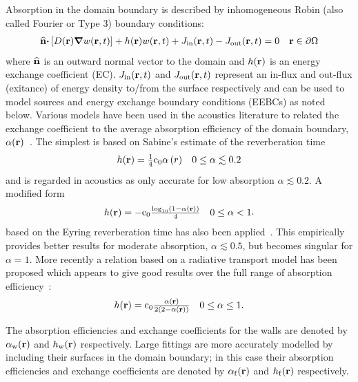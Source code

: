 \documentclass[a4paper]{article}
\numberwithin{equation}{section}
\begin{document}
Absorption in the domain boundary is described by inhomogeneous Robin (also
called Fourier or Type 3) boundary conditions:
\begin{align}
\begin{matrix}
\widehat{\boldsymbol{\mathrm{n}}}\boldsymbol{\mathrm{\cdot}}\left[D(\boldsymbol{\mathrm{r}})\boldsymbol{\mathrm{\nabla}} w(\boldsymbol{\mathrm{r}},t)\right] + h(\boldsymbol{\mathrm{r}}) w(\boldsymbol{\mathrm{r}},t) + J_\mathrm{in}(\boldsymbol{\mathrm{r}},t) - J_\mathrm{out}(\boldsymbol{\mathrm{r}},t) = 0 &\boldsymbol{\mathrm{r}}\in\partial\Omega
\end{matrix}
\end{align}
where $\widehat{\boldsymbol{\mathrm{n}}}$ is an outward normal vector to the domain and 
$h(\boldsymbol{\mathrm{r}})$ is an energy exchange coefficient (EC). $J_\mathrm{in}(\boldsymbol{\mathrm{r}},t)$ and
$J_\mathrm{out}(\boldsymbol{\mathrm{r}},t)$ represent an in-flux and out-flux (exitance) of energy density to/from the surface 
respectively and can be used to model sources and energy exchange boundary conditions (EEBCs) as noted below.
Various models have been used in the acoustics literature to related the exchange coefficient to the
average absorption efficiency of the domain boundary, $\alpha(\boldsymbol{\mathrm{r}})$~\citep{Jing2008,Xiang2009}. The
simplest is based on Sabine's estimate of the reverberation time~\citep{Sabine1922}
\begin{align}
\begin{matrix}
h(\boldsymbol{\mathrm{r}}) = \frac{1}{4}\mathrm{c}_0\alpha \left(r\right)&0\leq\alpha\lesssim 0.2
\end{matrix}
\end{align}
and is regarded in acoustics as only accurate for low absorption $\alpha\lesssim 0.2$. 
A modified form
\begin{align}
\begin{matrix}
h(\boldsymbol{\mathrm{r}}) = -\mathrm{c}_0\frac{\log_{10}\left(1-\alpha(\boldsymbol{\mathrm{r}})\right)}{4} &0\leq\alpha< 1
\end{matrix}.
\end{align}
based on the Eyring reverberation time has also been applied~\citep{Eyring1930}.
This empirically provides better results for moderate absorption, $\alpha\lesssim 0.5$, 
but becomes singular for $\alpha=1$. More recently a relation based on
a radiative transport model has been proposed which appears to give good
results over the full range of absorption efficiency~\citep{Jing2008}:
\begin{align}
\begin{matrix}
h(\boldsymbol{\mathrm{r}}) =\mathrm{c}_0\frac{\alpha(\boldsymbol{\mathrm{r}})}{2\left(2-\alpha(\boldsymbol{\mathrm{r}})\right)} & 0\leq\alpha\leq 1 .
\end{matrix}
\end{align}

The absorption efficiencies and exchange coefficients for the walls are denoted 
by $\alpha_{\mathrm{w}}(\boldsymbol{\mathrm{r}})$ and $h_{\mathrm{w}}(\boldsymbol{\mathrm{r}})$ respectively. Large fittings are more
accurately modelled by including their surfaces in the domain boundary; in 
this case their absorption efficiencies and exchange coefficients are denoted by
$\alpha_{\mathrm{f}}(\boldsymbol{\mathrm{r}})$ and $h_{\mathrm{f}}(\boldsymbol{\mathrm{r}})$ respectively.
\end{document}
